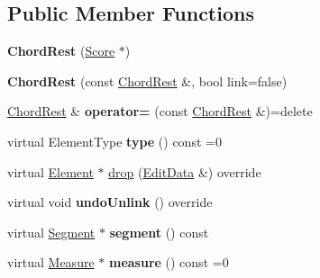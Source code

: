 \subsection*{Public Member Functions}
\begin{DoxyCompactItemize}
\item 
\mbox{\label{class_ms_1_1_chord_rest_a3863fe71f65aef569d2da067f79c27d0}} 
{\bfseries Chord\+Rest} (\hyperlink{class_ms_1_1_score}{Score} $\ast$)
\item 
\mbox{\label{class_ms_1_1_chord_rest_ae85a7ffd272fa445d18a455891bf9e9b}} 
{\bfseries Chord\+Rest} (const \hyperlink{class_ms_1_1_chord_rest}{Chord\+Rest} \&, bool link=false)
\item 
\mbox{\label{class_ms_1_1_chord_rest_a5967877ddcbffe6483a2e50cfb9b9a0f}} 
\hyperlink{class_ms_1_1_chord_rest}{Chord\+Rest} \& {\bfseries operator=} (const \hyperlink{class_ms_1_1_chord_rest}{Chord\+Rest} \&)=delete
\item 
\mbox{\label{class_ms_1_1_chord_rest_a47a641f4c229f43d67ed5154fdebc05c}} 
virtual Element\+Type {\bfseries type} () const =0
\item 
virtual \hyperlink{class_ms_1_1_element}{Element} $\ast$ \hyperlink{class_ms_1_1_chord_rest_a1277a12746bf12af5cbf79d95ada6a21}{drop} (\hyperlink{class_ms_1_1_edit_data}{Edit\+Data} \&) override
\item 
\mbox{\label{class_ms_1_1_chord_rest_af7d952577507bd43a7c5368805af6491}} 
virtual void {\bfseries undo\+Unlink} () override
\item 
\mbox{\label{class_ms_1_1_chord_rest_a94a3a697e4767c1e0ed46c205a81ac24}} 
virtual \hyperlink{class_ms_1_1_segment}{Segment} $\ast$ {\bfseries segment} () const
\item 
\mbox{\label{class_ms_1_1_chord_rest_aaa704d32c5e4253d54d722276f507e2d}} 
virtual \hyperlink{class_ms_1_1_measure}{Measure} $\ast$ {\bfseries measure} () const =0
\item 
\mbox{\label{class_ms_1_1_chord_rest_aa16f7cda08b815e078d628c491f6709a}} 

\end{DoxyCompactItemize}
